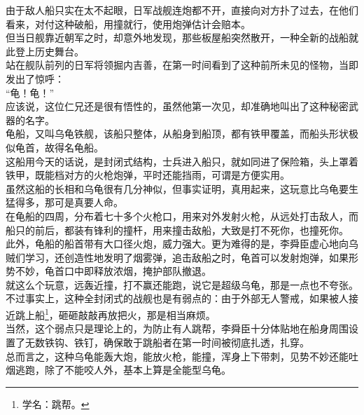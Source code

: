 \begin{multicols}{\theparacolNo}
由于敌人船只实在太不起眼，日军战舰连炮都不开，直接向对方扑了过去，在他们看来，对付这种破船，用撞就行，使用炮弹估计会赔本。\\

但当日舰靠近朝军之时，却意外地发现，那些板屋船突然散开，一种全新的战船就此登上历史舞台。\\

站在舰队前列的日军将领掘内吉善，在第一时间看到了这种前所未见的怪物，当即发出了惊呼：\\

“龟！龟！”\\

应该说，这位仁兄还是很有悟性的，虽然他第一次见，却准确地叫出了这种秘密武器的名字。\\

龟船，又叫乌龟铁舰，该船只整体，从船身到船顶，都有铁甲覆盖，而船头形状极似龟首，故得名龟船。\\

这船用今天的话说，是封闭式结构，士兵进入船只，就如同进了保险箱，头上罩着铁甲，既能档对方的火枪炮弹，平时还能挡雨，可谓是方便实用。\\

虽然这船的长相和乌龟很有几分神似，但事实证明，真用起来，这玩意比乌龟要生猛得多，那可是真要人命。\\

在龟船的四周，分布着七十多个火枪口，用来对外发射火枪，从远处打击敌人，而船只的前后，都装有锋利的撞杆，用来撞击敌船，大致是打不死你，也撞死你。\\

此外，龟船的船首带有大口径火炮，威力强大。更为难得的是，李舜臣虚心地向乌贼们学习，还创造性地发明了烟雾弹，追击敌船之时，龟首可以发射炮弹，如果形势不妙，龟首口中即释放浓烟，掩护部队撤退。\\

就这么个玩意，远轰近撞，打不赢还能跑，说它是超级乌龟，那是一点也不夸张。\\

不过事实上，这种全封闭式的战舰也是有弱点的：由于外部无人警戒，如果被人接近跳上船\footnote{学名：跳帮。}，砸砸敲敲再放把火，那是相当麻烦。\\

当然，这个弱点只是理论上的，为防止有人跳帮，李舜臣十分体贴地在船身周围设置了无数铁钩、铁钉，确保敢于跳船者在第一时间被彻底扎透，扎穿。\\

总而言之，这种乌龟能轰大炮，能放火枪，能撞，浑身上下带刺，见势不妙还能吐烟逃跑，除了不能咬人外，基本上算是全能型乌龟。\\


\end{multicols}
